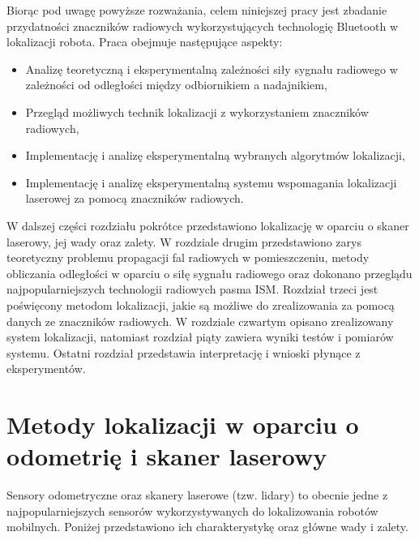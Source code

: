 Biorąc pod uwagę powyższe rozważania, celem niniejszej pracy jest zbadanie przydatności znaczników radiowych wykorzystujących technologię Bluetooth w lokalizacji robota. Praca obejmuje następujące aspekty:
\begin{itemize}
 \item Analizę teoretyczną i eksperymentalną zależności siły sygnału radiowego w zależności od odległości między odbiornikiem a nadajnikiem,
 \item Przegląd możliwych technik lokalizacji z wykorzystaniem znaczników radiowych,
 \item Implementację i analizę eksperymentalną wybranych algorytmów lokalizacji,
 \item Implementację i analizę eksperymentalną systemu wspomagania lokalizacji laserowej za pomocą znaczników radiowych. 
\end{itemize}


W dalszej części rozdziału pokrótce przedstawiono lokalizację w oparciu o skaner laserowy, jej wady oraz zalety. W rozdziale drugim przedstawiono zarys teoretyczny problemu propagacji fal radiowych w pomieszczeniu, metody obliczania odległości w oparciu o siłę sygnału radiowego oraz dokonano przeglądu najpopularniejszych technologii radiowych pasma ISM. Rozdział trzeci jest poświęcony metodom lokalizacji, jakie są możliwe do zrealizowania za pomocą danych ze znaczników radiowych. W rozdziale czwartym opisano zrealizowany system lokalizacji, natomiast rozdział piąty zawiera wyniki testów i pomiarów systemu. Ostatni rozdział przedstawia interpretację i wnioski płynące z eksperymentów.  

\section{Metody lokalizacji w oparciu o odometrię i skaner laserowy}
Sensory odometryczne oraz skanery laserowe (tzw. lidary) to obecnie jedne z najpopularniejszych sensorów wykorzystywanych do lokalizowania robotów mobilnych. Poniżej przedstawiono ich charakterystykę oraz główne wady i zalety. 
